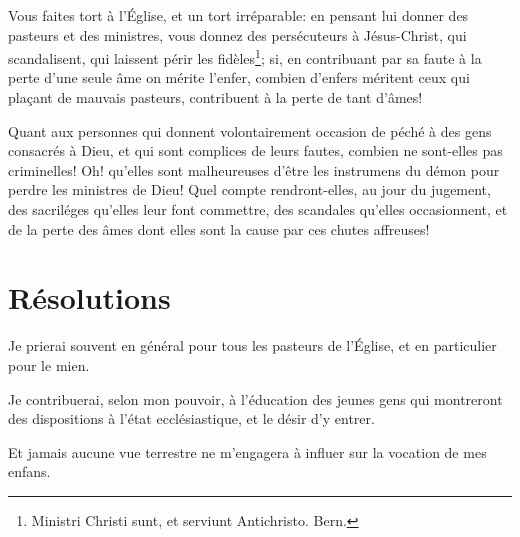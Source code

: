 \documentclass[instructions.tex]{subfiles}
\begin{document}
Vous faites tort à l'Église, et un tort irréparable: en pensant lui donner des pasteurs et des ministres, vous donnez des persécuteurs à Jésus-Christ, qui scandalisent, qui laissent périr les fidèles\footnote{Ministri Christi sunt, et serviunt Antichristo. Bern.}; si, en contribuant par sa faute à la perte d'une seule âme on mérite l'enfer, combien d'enfers méritent ceux qui plaçant de mauvais pasteurs, contribuent à la perte de tant d'âmes!
 
Quant aux personnes qui donnent volontairement occasion de péché à des gens consacrés à Dieu, et qui sont complices de leurs fautes, combien ne sont-elles pas criminelles! Oh! qu'elles sont malheureuses d'être les instrumens du démon pour perdre les ministres de Dieu! Quel compte rendront-elles, au jour du jugement, des sacriléges qu'elles leur font commettre, des scandales qu'elles occasionnent, et de la perte des âmes dont elles sont la cause par ces chutes affreuses!
 
\section{Résolutions}
 
\primo Je prierai souvent en général pour tous les pasteurs de l'Église, et en particulier pour le mien.
 
\secundo Je contribuerai, selon mon pouvoir, à l'éducation des jeunes gens qui montreront des dispositions à l'état ecclésiastique, et le désir d'y entrer.
 
\tertio Et jamais aucune vue terrestre ne m'engagera à influer sur la vocation de mes enfans. 

 
\end{document}
